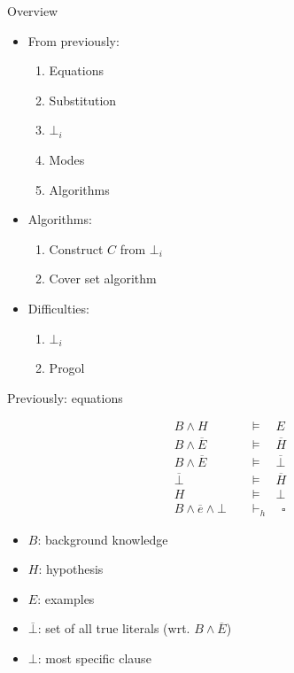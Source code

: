 \begin{frame}{Overview}

\begin{itemize}
\vfill
    \item From previously:
\begin{enumerate}
    \item Equations
    \item Substitution
    \item $\bot_i$
    \item Modes
    \item Algorithms
\end{enumerate}

\vfill
\item Algorithms:
\begin{enumerate}
    \item Construct $C$ from $\bot_i$
    \item Cover set algorithm
\end{enumerate}

\vfill
\item Difficulties:
\begin{enumerate}
    \item $\bot_i$
    \item Progol
\end{enumerate}
\vfill
\end{itemize}

\end{frame}


\begin{frame}{Previously: equations}

\begin{align}
B \land H \quad &\models \quad E \label{eq1} \\
B \land \overline{E} \quad &\models \quad \overline{H} \label{eq2} \\
B \land \overline{E} \quad &\models \quad \overline{\bot} \label{eq3} \\
\overline{\bot} \quad &\models \quad \overline{H} \label{eq4} \\
H \quad &\models \quad \bot \label{eq5} \\
B \land \overline{e} \land \bot \quad &\vdash_h \quad \square
\end{align}

\begin{itemize}
\item $B$: background knowledge
\item $H$: hypothesis
\item $E$: examples
\item $\overline{\bot}$: set of all true literals (wrt. $B \land \overline{E}$)
\item $\bot$: most specific clause
\end{itemize}

\end{frame}


